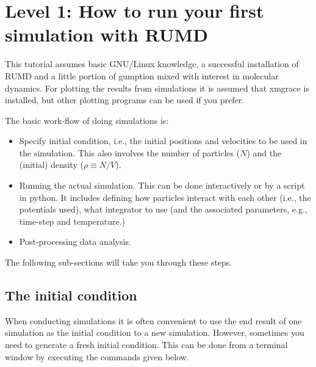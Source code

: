 
\section{Level 1: How to run your first simulation with RUMD }


%

This tutorial assumes basic GNU/Linux knowledge, a successful
installation of RUMD and a little portion of gumption mixed
with interest in molecular dynamics. For plotting the results 
from simulations it is assumed that xmgrace is installed, but 
other plotting programs can be used if you prefer. 

The basic work-flow of doing simulations is:
\begin{itemize}
  \item Specify initial condition, i.e., the initial positions 
        and velocities to be used in the simulation. This also involves
        the number of particles ($N$) and the (initial) density 
        ($\rho\equiv N/V$).
  \item Running the actual simulation. This can be done interactively 
        or by a script in python. It includes defining how particles 
        interact with each other (i.e., the potentials used), what 
        integrator to use (and the associated parameters, e.g., 
        time-step and temperature.)
  \item Post-processing data analysis.
\end{itemize}
The following sub-sections will take you through these steps.

\subsection{The initial condition}

When conducting simulations it is often convenient to use the end result 
of one simulation as the initial condition to a new simulation.
However, sometimes you need to generate a fresh initial condition. 
This can be done from a terminal window by executing the commands given below. 


